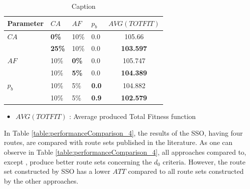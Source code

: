 \begin{table}
    \centering
    \begin{tabular}{|l|l|l|l||c|}
    \hline
    Parameter & $CA$ & $AF$ & $p_b$ & $AVG(TOTFIT)$ \\
    \hline
    $CA$ & \textbf{0\%} & 10\% & 0.0 & 105.66\\
    ~ & \textbf{25\%} & 10\% & 0.0 & \textbf{103.597}\\
    \hline
    $AF$ & 10\% & \textbf{0\%} & 0.0 & 105.747 \\
    ~ & 10\% & \textbf{5\%} & 0.0 & \textbf{104.389}\\
    \hline
    $p_b$ & 10\% & 5\% & \textbf{0.0} & 104.882\\
    ~ & 10\% & 5\% & \textbf{0.9} & \textbf{102.579}\\
    \hline
    \end{tabular}
    \caption {Caption}
    \tiny
    \begin{itemize}[noitemsep]
    \item[ ] $AVG(TOTFIT)$ : Average produced Total Fitness function
    \end{itemize}
    \label{table:pm2_inEvaluation}
\end{table}


In Table \vref{table:performanceComparison_4}, the results of the SSO, having four routes, are compared with route sets published in the literature. As one can observe in Table \vref{table:performanceComparison_4}, all approaches compared to, except \citep{mandl79, kidwai98, chakroborty02}, produce better route sets concerning the $d_0$ criteria. However, the route set constructed by SSO has a lower $ATT$ compared to all route sets constructed by the other approaches. 

